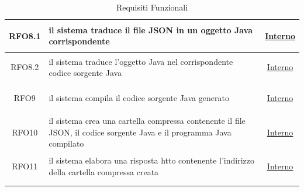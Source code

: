 \begin{longtable}{|c|>{\centering}m{7cm}|c|}
\hypertarget{RFO8.1}{RFO8.1} & il sistema traduce il file JSON in un oggetto Java corrispondente& \hyperlink{Interno}{Interno}\\ \hline

\hypertarget{RFO8.2}{RFO8.2} & il sistema traduce l'oggetto Java nel corrispondente codice sorgente Java & \hyperlink{Interno}{Interno}\\ \hline

\hypertarget{RFO9}{RFO9} & il sistema compila il codice sorgente Java generato& \hyperlink{Interno}{Interno}\\ \hline
	
\hypertarget{RFO10}{RFO10} & il sistema crea una cartella compressa contenente il file JSON, il codice sorgente Java e il programma Java compilato & \hyperlink{Interno}{Interno}\\ \hline

\hypertarget{RFO11}{RFO11} & il sistema elabora una risposta htto contenente l'indirizzo della cartella compressa creata & \hyperlink{Interno}{Interno}\\ \hline

\caption[Requisiti Funzionali]{Requisiti Funzionali}
\label{tabella:req0}
\end{longtable}
\clearpage

